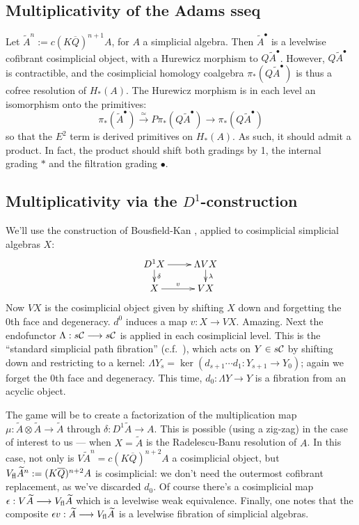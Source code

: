 \documentclass[10pt]{article}
\newcommand{\Comm}{\calC}
\begin{document}
\begin{prereqs for Thoughts III}
\section{Multiplicativity of the Adams sseq}
Let $\widetilde{A}^n:=c(K\overline{Q})^{n+1}A$, for $A$ a simplicial algebra. Then $\widetilde{A}^\bullet$ is a levelwise cofibrant cosimplicial object, with a Hurewicz morphism to $Q\widetilde{A}^\bullet$. However, $Q\widetilde{A}^\bullet$ is contractible, and the cosimplicial homology coalgebra $\pi_*(Q\widetilde{A}^\bullet)$ is thus a cofree resolution of $H_*(A)$. The Hurewicz morphism is in each level an isomorphism onto the primitives:
\[\pi_*(\widetilde{A}^\bullet)\overset{\simeq}{\to}P\pi_*(Q\widetilde{A}^\bullet)\overset{}{\to}\pi_*(Q\widetilde{A}^\bullet)\]
so that the $E^2$ term is derived primitives on $H_*(A)$. As such, it should admit a product. In fact, the product should shift both gradings by 1, the internal grading $*$ and the filtration grading $\bullet$.

\subsection{Multiplicativity via the $D^1$-construction}
We'll use the construction of Bousfield-Kan \cite{BK_pairings_products.pdf,BK_pairings.pdf}, applied to cosimplicial simplicial algebras $X$:
\[\xymatrix@R=4mm{
D^1X\ar[r]
\ar[d]^-{\delta}
&%
\Lambda VX\ar[d]^-{\lambda}
\\%
X\ar[r]^-{v}
&%
VX%
}\]
Now $VX$ is the cosimplicial object given by shifting $X$ down and forgetting the 0th face and degeneracy. $d^0$ induces a map $v:X\to VX$. Amazing. Next the endofunctor $\Lambda:s\Comm\to s\Comm$ is applied in each cosimplicial level. This is the ``standard simplicial path fibration'' (c.f.\ \cite[p.82]{BousKanSSeq.pdf}), which acts on $Y\in s\Comm$ by shifting down and restricting to a kernel: $\Lambda Y_s=\ker(d_{s+1}\cdots d_1:Y_{s+1}\to Y_0)$; again we forget the 0th face and degeneracy. This time, $d_0:\Lambda Y\to Y$ is a fibration from an acyclic object.

The game will be to create a factorization of the multiplication map $\mu:\widetilde{A}\otimes \widetilde{A}\to\widetilde{A}$ through $\delta:D^1\widetilde{A}\to A$. This is possible (using a zig-zag) in the case of interest to us --- when $X=\widetilde{A}$ is the Radelescu-Banu resolution of $A$. In this case, not only is $V\widetilde{A}^n=c(K\overline{Q})^{n+2}A$ a cosimplicial object, but $V_\textup{fl}\widetilde{A}^n:=(K\overline{Q})^{n+2}A$ is cosimplicial: we don't need the outermost cofibrant replacement, as we've discarded $d_0$. Of course there's a cosimplicial map $\epsilon:V\widetilde{A}\to V_\textup{fl}\widetilde{A}$ which is a levelwise weak equivalence. Finally, one notes that the composite $\epsilon\circ v:\widetilde{A}\to V_\textup{fl}\widetilde{A}$ is a levelwise fibration of simplicial algebras. 


\end{prereqs for Thoughts III}
\end{document}
